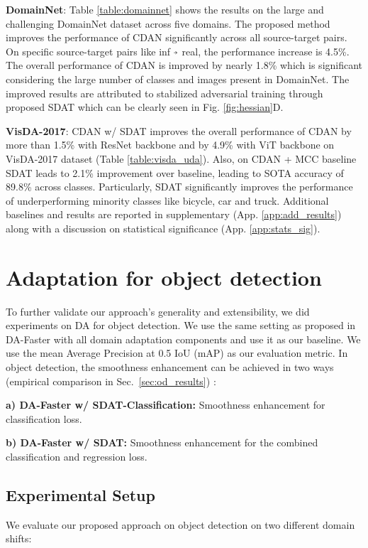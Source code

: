 \documentclass[table,dvipsnames]{article}
\newcommand{\veryshortarrow}[1][3pt]{\mathrel{\hbox{\rule[\dimexpr\fontdimen22\textfont2-.2pt\relax]{#1}{.4pt}}\mkern-4mu\hbox{\usefont{U}{lasy}{m}{n}\symbol{41}}}} \newcommand{\cmark}{\ding{51}}\newcommand{\xmark}{\ding{55}}\usepackage{amssymb}\usepackage{pifont}\usepackage[hyphens]{url}
\theoremstyle{plain}
\theoremstyle{definition}
\theoremstyle{remark}
\begin{document}
\textbf{DomainNet}: Table \ref{table:domainnet} shows the results on the large and challenging DomainNet dataset across five domains. The proposed method improves the performance of CDAN significantly across all source-target pairs. On specific source-target pairs like inf $\veryshortarrow$ real, the performance increase is 4.5\%. The overall performance of CDAN is improved by nearly 1.8\% which is significant considering the large number of classes and images present in DomainNet. The improved results are attributed to stabilized adversarial training through proposed SDAT which can be clearly seen in Fig. \ref{fig:hessian}\textcolor{mydarkblue}{D}.

\textbf{VisDA-2017}: CDAN w/ SDAT improves the overall performance of CDAN by more than 1.5\% with ResNet backbone and by 4.9\% with ViT backbone on VisDA-2017 dataset (Table \ref{table:visda_uda}). Also, on CDAN + MCC baseline SDAT leads to 2.1\% improvement over baseline, leading to SOTA accuracy of 89.8\% across classes.  Particularly, SDAT significantly improves the performance of underperforming minority classes like bicycle, car and truck.  Additional baselines and results are reported in supplementary (App. \ref{app:add_results}) {along with a discussion on statistical significance (App. \ref{app:stats_sig})}.






\section{Adaptation for object detection}
To further validate our approach's generality and extensibility, we did experiments on DA for object detection. We use the same setting as proposed in DA-Faster \citep{chen2018domaindafaster} with all domain adaptation components and use it as our baseline. We use the mean Average Precision at 0.5 IoU (mAP) as our evaluation metric. In object detection, the smoothness enhancement can be achieved in two ways (empirical comparison in Sec.~\ref{sec:od_results}) :

\textbf{a) DA-Faster w/ SDAT-Classification:} Smoothness enhancement for classification loss.

\textbf{b) DA-Faster w/ SDAT:} Smoothness enhancement for the combined classification and regression loss.
\subsection{Experimental Setup}
We evaluate our proposed approach on object detection on two different domain shifts:
\end{document}
